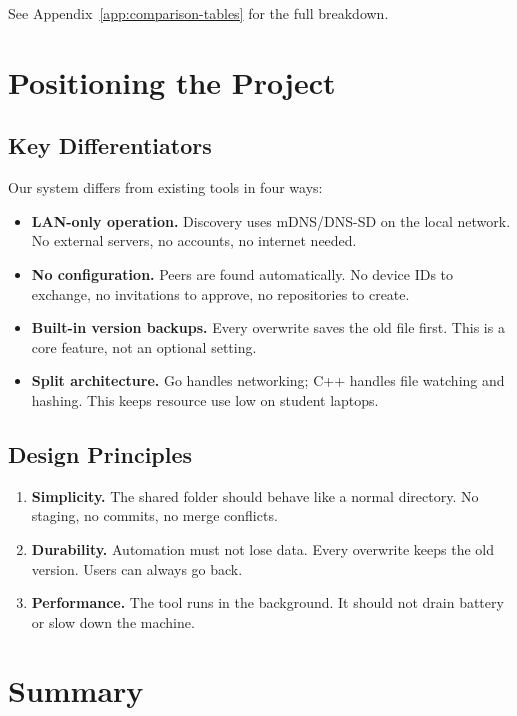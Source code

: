 See Appendix~\ref{app:comparison-tables} for the full breakdown.

\section{Positioning the Project}

\subsection{Key Differentiators}

Our system differs from existing tools in four ways:

\begin{itemize}
    \item \textbf{LAN-only operation.} Discovery uses mDNS/DNS-SD on the local network. No external servers, no accounts, no internet needed.
    \item \textbf{No configuration.} Peers are found automatically. No device IDs to exchange, no invitations to approve, no repositories to create.
    \item \textbf{Built-in version backups.} Every overwrite saves the old file first. This is a core feature, not an optional setting.
    \item \textbf{Split architecture.} Go handles networking; C++ handles file watching and hashing. This keeps resource use low on student laptops.
\end{itemize}

\subsection{Design Principles}

\begin{enumerate}
    \item \textbf{Simplicity.} The shared folder should behave like a normal directory. No staging, no commits, no merge conflicts.
    \item \textbf{Durability.} Automation must not lose data. Every overwrite keeps the old version. Users can always go back.
    \item \textbf{Performance.} The tool runs in the background. It should not drain battery or slow down the machine.
\end{enumerate}

\section{Summary}


